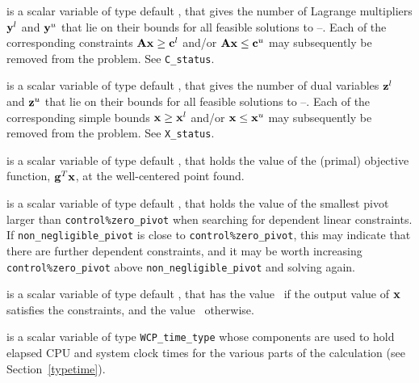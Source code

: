 \documentclass{galahad}
\newcommand{\packagename}{WCP}
\begin{document}
\begin{description}
 is a scalar variable of type default \integer, that gives the
number of Lagrange multipliers ${\mathbf{y}}^l$ and ${\mathbf{y}}^u$ that lie on their bounds 
for all feasible solutions to --. Each of the
corresponding constraints ${\mathbf{A}} {\mathbf{x}} \geq {\mathbf{c}}^l$ and/or 
${\mathbf{A}} {\mathbf{x}} \leq {\mathbf{c}}^u$ may subsequently be removed from the problem.
See {\tt C\_status}.

 is a scalar variable of type default \integer, that gives the
number of dual variables ${\mathbf{z}}^l$ and ${\mathbf{z}}^u$ that lie on their bounds 
for all feasible solutions to --. Each of the
corresponding simple bounds ${\mathbf{x}} \geq {\mathbf{x}}^l$ and/or 
${\mathbf{x}} \leq {\mathbf{x}}^u$ may subsequently be removed from the problem.
See {\tt X\_status}.

 is a scalar variable of type default \realdp, that holds the
value of the (primal) objective function, ${\mathbf{g}}^T {\mathbf{x}}$, 
at the well-centered point found.

 is a scalar variable of type default \realdp, 
that holds the value of the smallest pivot larger than {\tt control\%zero\_pivot}
when searching for dependent linear constraints. If 
{\tt non\_negligible\_pivot} is close to  {\tt control\%zero\_pivot},
this may indicate that there are further dependent constraints, and
it may be worth increasing {\tt control\%zero\_pivot} above 
{\tt non\_negligible\_pivot} and solving again.

 is a scalar variable of type default \logical, that has the
value \true\ if the output value of ${\mathbf{x}}$ satisfies the constraints,
and the value \false\ otherwise.

 is a scalar variable of type {\tt \packagename\_time\_type} 
whose components are used to hold elapsed CPU and system clock times for 
the various parts of the calculation (see Section~\ref{typetime}).


\end{description}
\end{document}
